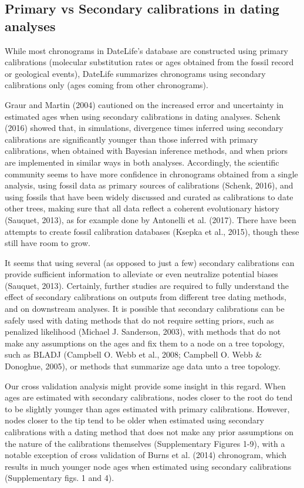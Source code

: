 \documentclass[
  english,
  man]{apa6}
\begin{document}
\hypertarget{primary-vs-secondary-calibrations-in-dating-analyses}{%
\subsection{Primary vs Secondary calibrations in dating analyses}\label{primary-vs-secondary-calibrations-in-dating-analyses}}

While most chronograms in DateLife's database are constructed using primary calibrations (molecular substitution rates or ages obtained from the fossil record or geological events), DateLife summarizes chronograms using secondary calibrations only (ages coming from other chronograms).

Graur and Martin (2004) cautioned on the increased error and uncertainty in estimated ages when using secondary calibrations in dating analyses.
Schenk (2016) showed that, in simulations, divergence times inferred using secondary calibrations are significantly younger than those inferred with primary calibrations, when obtained with Bayesian inference methods, and when priors are implemented in similar ways in both analyses.
Accordingly, the scientific community seems to have more confidence in chronograms obtained from a single analysis, using fossil data as primary sources of calibrations (Schenk, 2016), and using fossils that have been widely discussed and curated as calibrations to date other trees, making sure that all data reflect a coherent evolutionary history (Sauquet, 2013), as for example done by Antonelli et al. (2017).
There have been attempts to create fossil calibration databases (Ksepka et al., 2015), though these still have room to grow.

It seems that using several (as opposed to just a few) secondary calibrations can provide sufficient information to alleviate or even neutralize potential biases (Sauquet, 2013).
Certainly, further studies are required to fully understand the effect of secondary calibrations on outputs from different tree dating methods, and on downstream analyses. It is possible that secondary calibrations can be safely used with dating methods that do not require setting priors, such as penalized likelihood (Michael J. Sanderson, 2003), with methods that do not make any assumptions on the ages and fix them to a node on a tree topology, such as BLADJ (Campbell O. Webb et al., 2008; Campbell O. Webb \& Donoghue, 2005), or methods that summarize age data unto a tree topology.

Our cross validation analysis might provide some insight in this regard. When ages are estimated with secondary calibrations, nodes closer to the root do tend to be slightly younger than ages estimated with primary calibrations. However, nodes closer to the tip tend to be older when estimated using secondary calibrations with a dating method that does not make any prior assumptions on the nature of the calibrations themselves (Supplementary Figures 1-9), with a notable exception of cross validation of Burns et al. (2014) chronogram, which results in much younger node ages when estimated using secondary calibrations (Supplementary figs. 1 and 4).
\end{document}
